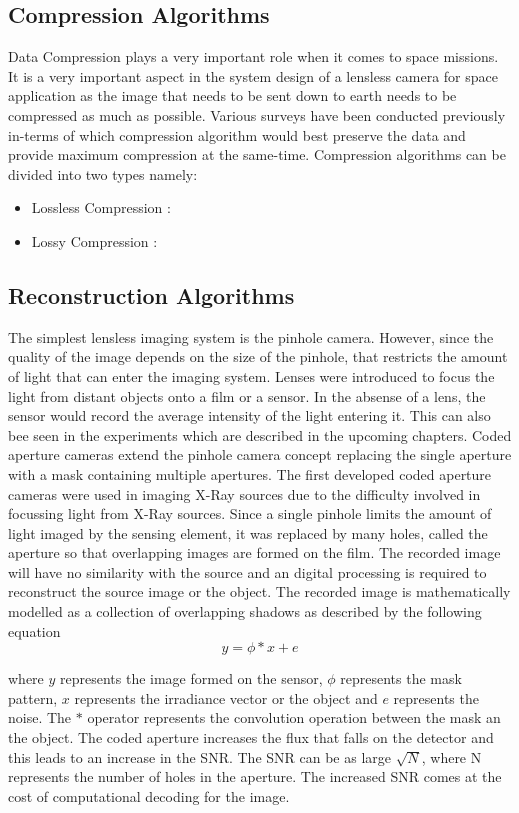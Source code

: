 \subsection{Compression Algorithms}
Data Compression plays a very important role when it comes to space missions. It is a very important aspect in the system design of a lensless camera for space application as the image that needs to be sent down to earth needs to be compressed as much as possible. Various surveys\cite{Compression2}\cite{Compression3}\cite{Compression4} have been conducted previously in-terms of which compression algorithm would best preserve the data and provide maximum compression at the same-time. Compression algorithms can be divided into two types namely:
\begin{itemize}
\item Lossless Compression :
\item Lossy Compression :
\end{itemize}
\subsection{Reconstruction Algorithms}
The simplest lensless imaging system is the pinhole camera. However, since the quality of the image depends on the size of the pinhole, that restricts the amount of light that can enter the imaging system. Lenses were introduced to focus the light from distant objects onto a film or a sensor. In the absense of a lens, the sensor would record the average intensity of the light entering it. This can also bee seen in the experiments which are described in the upcoming chapters. Coded aperture cameras extend the pinhole camera concept replacing the single aperture with a mask containing multiple apertures. The first developed coded aperture cameras were used in imaging X-Ray sources due to the difficulty involved in focussing light from X-Ray sources\cite{Cannon1}. Since a single pinhole limits the amount of light imaged by the sensing element, it was replaced by many holes, called the aperture so that overlapping images are formed on the film. The recorded image will have no similarity with the source and an digital processing is required to reconstruct the source image or the object. The recorded image is mathematically modelled as a  collection of overlapping shadows as described by the following equation\cite{VBoomi}\cite{Cannon1} 
\begin{equation}
y = \phi * x + e
\end{equation}

where $y$ represents the image formed on the sensor, $\phi$ represents the mask pattern, $x$ represents the irradiance vector or the object and $e$ represents the noise. The $*$ operator represents the convolution operation between the mask an the object. The coded aperture increases the flux that falls on the detector and this leads to an increase in the SNR. The SNR can be as large $\sqrt{N}$, where N represents the number of holes in the aperture\cite{Cannon1}. The increased SNR comes at the cost of computational decoding for the image. 